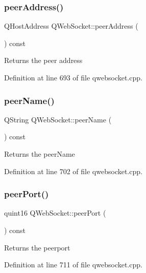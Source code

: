 \subsubsection{\texorpdfstring{peer\+Address()}{peerAddress()}}
{\footnotesize\ttfamily Q\+Host\+Address Q\+Web\+Socket\+::peer\+Address (\begin{DoxyParamCaption}{ }\end{DoxyParamCaption}) const}

Returns the peer address 

Definition at line 693 of file qwebsocket.\+cpp.

\mbox{\label{class_q_web_socket_a9de6e280d531c748d22898775b7f87f3}} 
\subsubsection{\texorpdfstring{peer\+Name()}{peerName()}}
{\footnotesize\ttfamily Q\+String Q\+Web\+Socket\+::peer\+Name (\begin{DoxyParamCaption}{ }\end{DoxyParamCaption}) const}

Returns the peer\+Name 

Definition at line 702 of file qwebsocket.\+cpp.

\mbox{\label{class_q_web_socket_ab8587d64043f65c8da7944541fab584c}} 
\subsubsection{\texorpdfstring{peer\+Port()}{peerPort()}}
{\footnotesize\ttfamily quint16 Q\+Web\+Socket\+::peer\+Port (\begin{DoxyParamCaption}{ }\end{DoxyParamCaption}) const}

Returns the peerport 

Definition at line 711 of file qwebsocket.\+cpp.

\mbox{\label{class_q_web_socket_add33f933cd9ceffdc03d6b3c6e948d89}} 
